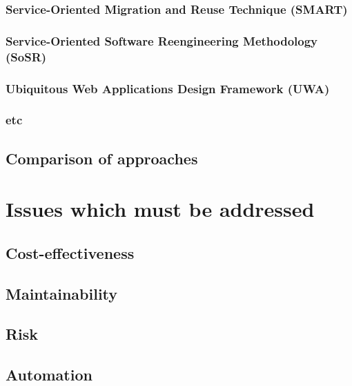 \documentclass[12pt,journal,compsoc]{IEEEtran}
\begin{document}
\subsubsection{Service-Oriented Migration and Reuse Technique (SMART)}
\label{subsubsec:smart}

\subsubsection{Service-Oriented Software Reengineering Methodology (SoSR)}
\label{subsubsec:sosr}

\subsubsection{Ubiquitous Web Applications Design Framework (UWA)}
\label{subsubsec:uwa}

\subsubsection{etc}

\subsection{Comparison of approaches}
\label{subsec:comparison}

\section{Issues which must be addressed}
\label{sec:issues}

\subsection{Cost-effectiveness}
\label{subsec:costeffectiveness}

\subsection{Maintainability}
\label{subsec:maintainability}

\subsection{Risk}
\label{subsec:risk}

\subsection{Automation}
\label{subsec:automation}
\end{document}
